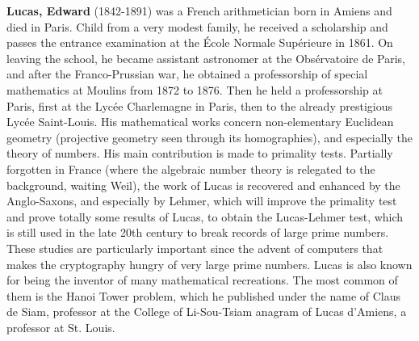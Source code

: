 \textbf{Lucas, Edward} (1842-1891) was a French arithmetician born in Amiens and died in Paris. Child from a very modest family, he received a scholarship and passes the entrance examination at the École Normale Supérieure in 1861. On leaving the school, he became assistant astronomer at the Obsérvatoire de Paris, and after the Franco-Prussian war, he obtained a professorship of special mathematics at Moulins from 1872 to 1876. Then he held a professorship at Paris, first at the Lycée Charlemagne in Paris, then to the already prestigious Lycée Saint-Louis. His mathematical works concern non-elementary Euclidean geometry (projective geometry seen through its homographies), and especially the theory of numbers. His main contribution is made to primality tests. Partially forgotten in France (where the algebraic number theory is relegated to the background, waiting Weil), the work of Lucas is recovered and enhanced by the Anglo-Saxons, and especially by Lehmer, which will improve the primality test and prove totally some results of Lucas, to obtain the Lucas-Lehmer test, which is still used in the late 20th century to break records of large prime numbers. These studies are particularly important since the advent of computers that makes the cryptography hungry of very large prime numbers. Lucas is also known for being the inventor of many mathematical recreations. The most common of them is the Hanoi Tower problem, which he published under the name of Claus de Siam, professor at the College of Li-Sou-Tsiam anagram of Lucas d'Amiens, a professor at St. Louis.

{}
\label{sec:M}

